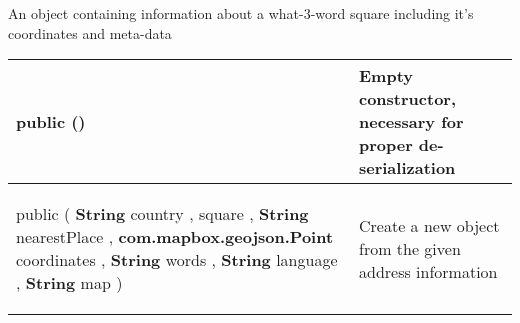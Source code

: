  {\scriptsize An object containing information about a what{-}3{-}word square including it's coordinates and meta{-}data
 
\vspace*{-5pt} 
\begin{tabularx}{\linewidth}{m{}|m{}}
\label{tab:W3WAddressData}
\begin{raggedleft}public  \textbf{\hyperref[tab:W3WAddressData]{\color{blue}{W3WAddressData}}}()
\end{raggedleft} &
 Empty constructor, necessary for proper de{-}serialization\\ \hline 
\begin{raggedleft}public  \textbf{\hyperref[tab:W3WAddressData]{\color{blue}{W3WAddressData}} }(\newline \hfill 
\hspace*{ 5pt} \textbf{String} country , \newline
 \hspace*{ 5pt} \textbf{\hyperref[tab:W3WSquareData]{\color{blue}{W3WSquareData}}} square , \newline
 \hspace*{ 5pt} \textbf{String} nearestPlace , \newline
 \hspace*{ 5pt} \textbf{com.mapbox.geojson.Point} coordinates , \newline
 \hspace*{ 5pt} \textbf{String} words , \newline
 \hspace*{ 5pt} \textbf{String} language , \newline
 \hspace*{ 5pt} \textbf{String} map  )
\end{raggedleft} &
 Create a new \hyperref[tab:W3WAddressData]{\color{blue}{W3WAddressData}} object from the given address information\\\end{tabularx}
}
